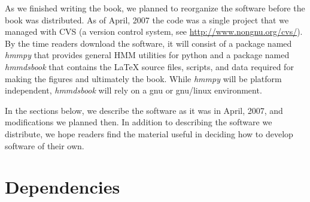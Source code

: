 As we finished writing the book, we planned to reorganize the software
before the book was distributed.  As of April, 2007 the code was a
single project that we managed with CVS (a version control system, see
\url{http://www.nongnu.org/cvs/}).  By the time readers download the
software, it will consist of a package named \emph{hmmpy} that
provides general HMM utilities for python and a package named
\emph{hmmdsbook} that contains the LaTeX source files, scripts, and
data required for making the figures and ultimately the book.  While
\emph{hmmpy} will be platform independent, \emph{hmmdsbook} will rely
on a gnu or gnu/linux environment.

In the sections below, we describe the software as it was in April,
2007, and modifications we planned then.  In addition to describing
the software we distribute, we hope readers find the material useful
in deciding how to develop software of their own.

\section{Dependencies}
\label{sec:SWdep}

